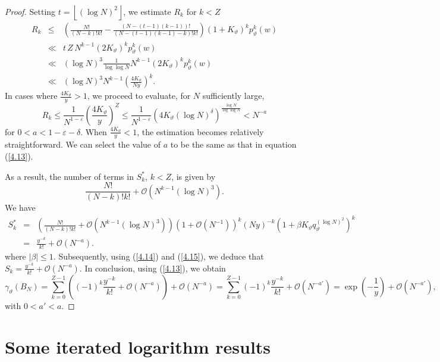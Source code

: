 \documentclass[final,1p,times]{elsarticle}
\numberwithin{equation}{section}
\begin{document}
\begin{proof}
Setting $t = \left \lfloor (\log N)^2\right\rfloor$, we estimate $R_k$ for $k<Z$
\begin{eqnarray*}
R_k &\leq& \left( \frac{N!}{(N-k)!k!} - \frac{(N-(t-1)(k-1))!}{(N-(t-1)(k-1)-k)!k!} \right) (1+K_{\vartheta})^k p^k_{\vartheta}(w) \\
&\ll& t \, Z\, N^{k-1} (2K_{\vartheta})^k p^k_{\vartheta}(w) \\
&\ll& (\log N)^3 \frac{1}{\log \log N} N^{k-1} (2K_{\vartheta})^k p^k_{\vartheta}(w) \\
&\ll& (\log N)^3 N^{k-1} \left( \frac{4K_{\vartheta}}{Ny}\right)^k.
\end{eqnarray*}
In cases where $\frac{4K_{\vartheta}}{y} > 1$, we proceed to evaluate, for $N$ sufficiently large,
\begin{equation} \label{4.14}
R_{k} \leq \frac{1}{N^{1-\varepsilon}}\left(\frac{4K_{\vartheta}}{y}\right)^Z 
\leq \frac{1}{N^{1-\varepsilon}} \left( 4K_{\vartheta} (\log N)^{\delta}\right)^{\frac{\log N}{\log \log N}} < N^{-a}
\end{equation}
for $0 < a < 1-\varepsilon - \delta$. 
When $\frac{4K_{\vartheta}}{y} < 1$, the estimation becomes relatively straightforward.
We can select the value of $a$ to be the same as that in equation (\ref{4.13}). 

As a result, the number of terms in $S^*_k$, $k < Z$, is given by  
\[
\frac{N!}{(N-k)!k!} + \mathcal{O}\left( N^{k-1}(\log N)^3\right).
\]
We have
\begin{eqnarray} \label{4.15}
S^*_k &=& \left( \frac{N!}{(N-k)!k!} + \mathcal{O}\left( N^{k-1}(\log N)^3\right) \right) \left( 1+ \mathcal{O}\left( N^{-1}\right)  \right)^k \left(Ny \right)^{-k} \left(1+\beta K_{\vartheta}q^{(\log N)^2}_{\vartheta} \right)^k \nonumber \\
&=& \frac{y^{-k}}{k!} + \mathcal{O}\left( N^{-a} \right).
\end{eqnarray}
where $|\beta| \leq 1$. 
Subsequently, using (\ref{4.14}) and (\ref{4.15}), we deduce that 
$S_k = \frac{y^{-k}}{k!} + \mathcal{O}\left( N^{-a} \right)$. 
In conclusion, using (\ref{4.13}), we obtain
\[
\gamma_{\vartheta} (B_N) = \sum_{k=0}^{Z-1} \left( (-1)^k \frac{y^{-k}}{k!} + \mathcal{O}\left( N^{-a} \right)  \right) + \mathcal{O}\left( N^{-a} \right) = 
\sum_{k=0}^{Z-1} (-1)^k \frac{y^{-k}}{k!} + \mathcal{O}\left( N^{-a'} \right) = \exp\left(-\frac{1}{y} \right) 
+ \mathcal{O}\left( N^{-a'} \right),
\] 
with $0 < a' < a$. 
\end{proof}


\section{Some iterated logarithm results}
\end{document}

